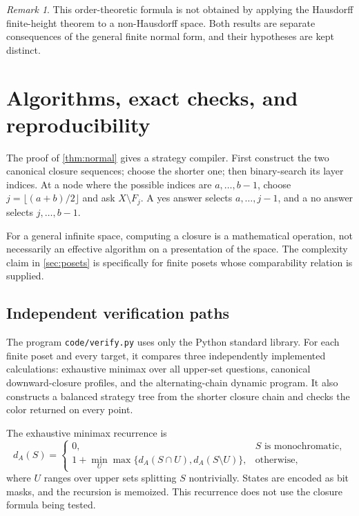 \documentclass[11pt,letterpaper]{article}
\numberwithin{equation}{section}
\theoremstyle{definition}
\theoremstyle{remark}
\newtheorem{remark}[remark]{Remark}
\begin{document}
\begin{remark}
This order-theoretic formula is not obtained by applying the Hausdorff
finite-height theorem to a non-Hausdorff space. Both results are separate
consequences of the general finite normal form, and their hypotheses are kept
distinct.
\end{remark}

\section{Algorithms, exact checks, and reproducibility}\label{sec:checks}

The proof of \cref{thm:normal} gives a strategy compiler. First construct the two
canonical closure sequences; choose the shorter one; then binary-search its
layer indices. At a node where the possible indices are $a,\ldots,b-1$, choose
$j=\lfloor(a+b)/2\rfloor$ and ask $X\setminus F_j$. A yes answer selects
$a,\ldots,j-1$, and a no answer selects $j,\ldots,b-1$.

For a general infinite space, computing a closure is a mathematical operation,
not necessarily an effective algorithm on a presentation of the space. The
complexity claim in \cref{sec:posets} is specifically for finite posets whose
comparability relation is supplied.

\subsection{Independent verification paths}

The program \texttt{code/verify.py} uses only the Python standard library.
For each finite poset and every target, it compares three independently
implemented calculations: exhaustive minimax over all upper-set questions,
canonical downward-closure profiles, and the alternating-chain dynamic program.
It also constructs a balanced strategy tree from the shorter closure chain and
checks the color returned on every point.

The exhaustive minimax recurrence is
\[
 d_A(S)=
 \begin{cases}
 0,&S\text{ is monochromatic},\\
 1+\displaystyle\min_U\max\{d_A(S\cap U),d_A(S\setminus U)\},&\text{otherwise},
 \end{cases}
\]
where $U$ ranges over upper sets splitting $S$ nontrivially. States are encoded
as bit masks, and the recursion is memoized. This recurrence does not use the
closure formula being tested.
\end{document}

